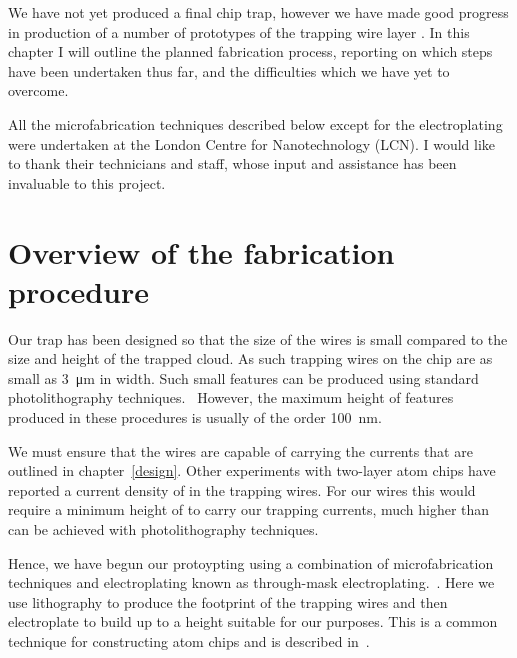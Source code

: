 We have not yet produced a final chip trap, however we have made good progress
in production of a number of prototypes of the trapping wire layer . In this chapter I will outline the
planned fabrication process, reporting on which steps have been undertaken thus
far, and the difficulties which we have yet to overcome.

All the microfabrication techniques described below except for the
electroplating were undertaken at the London Centre for Nanotechnology (LCN). I
would like to thank their technicians and staff, whose input and assistance has
been invaluable to this project. 

\section{Overview of the fabrication procedure}

Our trap has been designed so that the size of the wires is small compared to
the size and height of the trapped cloud. As such trapping wires on the chip
are as small as \SI{3}{\micro\meter} in width. Such small features can be
produced using standard photolithography techniques.~\cite{Madou2002} However,
the maximum height of features produced in these procedures is usually of the
order \SI{100}{\nano\meter}.

We must ensure that the wires are capable of carrying the currents that are
outlined in chapter~\ref{design}.  Other experiments with two-layer atom chips
have reported a current density of  in the trapping wires. For our wires
this would require a minimum height of  to carry our trapping
currents, much higher than can be achieved with photolithography techniques.

Hence, we have begun our protoypting using a combination of microfabrication
techniques and electroplating known as through-mask
electroplating.~\cite{Ruythooren_2000}. Here we use lithography to produce the
footprint of the trapping wires and then electroplate to build up to a height
suitable for our purposes. This is a common technique for constructing atom
chips and is described in~\cite{2011Ac, Lev2003, KOUKHARENKO2004600}.

